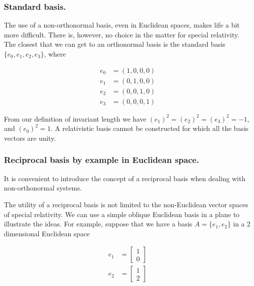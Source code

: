 \subsubsection{Standard basis.}

The use of a non-orthonormal basis, even in Euclidean spaces, makes life a bit more difficult.  There is, however, no choice in the matter for special relativity.  The closest that we can get to an orthonormal basis is the standard basis $\{e_0, e_1, e_2, e_3\}$, where

\begin{equation}\label{eqn:grahamSchmidtLorentz:70}
\begin{aligned}
e_0 &= (1, 0, 0, 0) \\
e_1 &= (0, 1, 0, 0) \\
e_2 &= (0, 0, 1, 0) \\
e_3 &= (0, 0, 0, 1) 
\end{aligned}
\end{equation}

From our definition of invariant length we have $(e_1)^2 = (e_2)^2 = (e_3)^2 = -1$, and $(e_0)^2 = 1$.  A relativistic basis cannot be constructed for which all the basis vectors are unity.

\subsubsection{Reciprocal basis by example in Euclidean space.}

It is convenient to introduce the concept of a reciprocal basis when dealing with non-orthonormal systems.

The utility of a reciprocal basis is not limited to the non-Euclidean vector spaces of special relativity.  We can use a simple oblique Euclidean basis in a plane to illustrate the ideas.  For example, suppose that we have a basis $A = \{e_1, e_2\}$ in a 2 dimensional Euclidean space

\begin{equation}\label{eqn:grahamSchmidtLorentz:90}
\begin{aligned}
e_1 &= 
\begin{bmatrix}
1 \\
0
\end{bmatrix} \\
e_2 &= 
\begin{bmatrix}
1 \\
2
\end{bmatrix} 
\end{aligned}
\end{equation}

